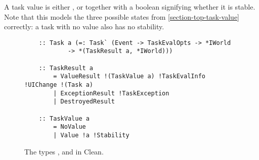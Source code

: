 A task value is either , or  together with a boolean  signifying whether it is stable. Note that this models the three possible states from \ref{section-top-task-value} correctly: a task with no value also has no stability.

\begin{figure}[ht]
    \centering
    \begin{verbatim}
    :: Task a (=: Task` (Event -> TaskEvalOpts -> *IWorld
            -> *(TaskResult a, *IWorld)))
    
    :: TaskResult a
        = ValueResult !(TaskValue a) !TaskEvalInfo !UIChange !(Task a)
        | ExceptionResult !TaskException
        | DestroyedResult
    
    :: TaskValue a
        = NoValue
        | Value !a !Stability
    \end{verbatim}
    \caption{The types ,  and  in Clean.}
    \label{lst:clean_task_taskresult_types}
\end{figure}
